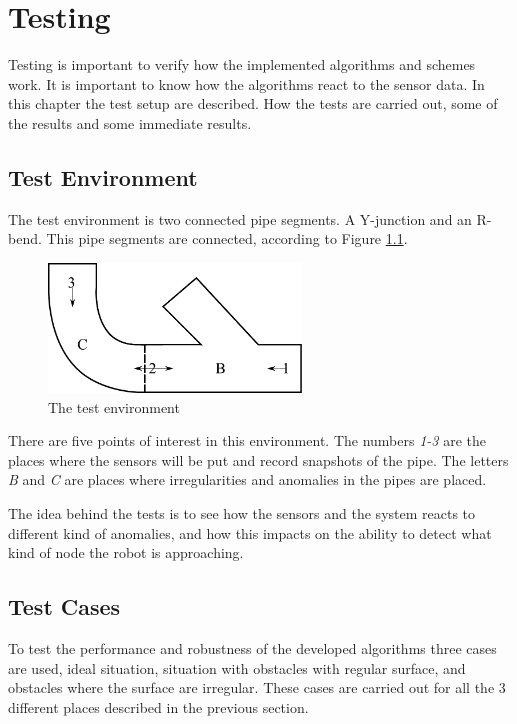 \chapter{Testing}
\label{chap7}
Testing is important to verify how the implemented algorithms and schemes work. It is
important to know how the algorithms react to the sensor data. 
In this chapter the test setup are described. How the tests are carried out, 
some of the results and some immediate results. 


\section{Test Environment}
The test environment is two connected pipe segments. A Y-junction and an R-bend. This
pipe segments are connected, according to Figure \ref{chap7:fig-environment}.
\begin{figure}[htbp]
    \centering
    \includegraphics[width=0.6\textwidth]{pics/test-environment}
    \caption{The test environment}
    \label{chap7:fig-environment}
\end{figure}
There are five points of interest in this environment. 
The numbers \emph{1-3} are the places where the sensors will be put and record snapshots of the pipe. 
The letters \emph{B} and \emph{C} are places where irregularities and anomalies in the pipes are placed. 

The idea behind the tests is to see how the sensors and the system reacts to different
kind of anomalies, and how this impacts on the ability to detect what kind of node the
robot is approaching. 


\section{Test Cases}
To test the performance and robustness of the developed algorithms three cases are used,
ideal situation, situation with obstacles with regular surface, and obstacles where the
surface are irregular. These cases are carried out for all the 3 different places described
in the previous section.


